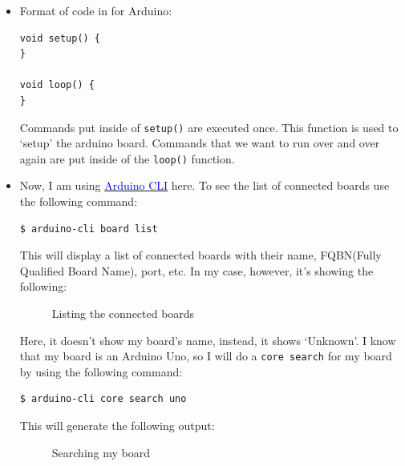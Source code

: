 \documentclass{article}
\begin{document}
\begin{itemize}
	\item Format of code in for Arduino:
	
	\begin{lstlisting}[frame=TlbR, caption=Arduino code format]
void setup() {
}

void loop() {
}
	\end{lstlisting}

Commands put inside of \lstinline|setup()| are executed once. This function is used to `setup' the arduino board. Commands that we want to run over and over again are put inside of the \lstinline|loop()| function.

\item Now, I am using \href{https://arduino.github.io/arduino-cli/1.0/}{\textcolor{Blue}{Arduino CLI}} here. To see the list of connected boards use the following command:

\begin{lstlisting}[frame=tLBr, caption=Viewing the list of connected boards]
$ arduino-cli board list
\end{lstlisting}

This will display a list of connected boards with their name, FQBN(Fully Qualified Board Name), port, etc. In my case, however, it's showing the following:

\begin{figure}[H]
	\centering
	\caption{Listing the connected boards}
	\label{fig:fig1}
\end{figure}

Here, it doesn't show my board's name, instead, it shows `Unknown'. I know that my board is an Arduino Uno, so I will do a \lstinline|core search| for my board by using the following command:

\begin{lstlisting}[frame=tLBr, caption=Search for my board]
$ arduino-cli core search uno
\end{lstlisting}

\pagebreak
This will generate the following output:

\begin{figure}[H]
	\centering
	\caption{Searching my board}
	\label{fig:fig2}
\end{figure}


\end{itemize}
\end{document}
